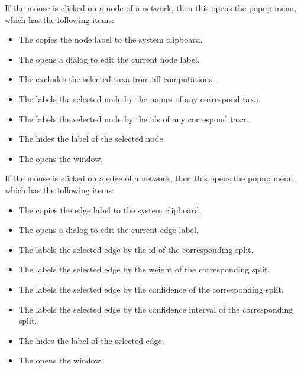 \documentclass[11pt]{article}
\begin{document}
If the mouse is clicked on a node of a network, then this opens
the  popup menu, which has the following items:
\begin{itemize}
\item The  copies the node label
to the system clipboard.
\item The  opens a dialog to edit the
current node label.
\item The  excludes the
selected taxa from all computations.
\item The  labels the selected node
by the names of any correspond taxa.
\item The  labels the selected node
by the ids of any correspond taxa.
\item The  hides the label of the selected
node.
\item The  opens the  window.
\end{itemize}

If the mouse is clicked on a edge of a network, then this opens
the  popup menu, which has the following items:
\begin{itemize}
\item The  copies the edge label
to the system clipboard.
\item The  opens a dialog to edit the
current edge label.
\item The  labels the selected edge
by the id of the corresponding split.
\item The  labels the selected edge
by the weight of the corresponding split.
\item The  labels the selected edge
by the confidence of the corresponding split.
\item The  labels the selected edge
by the confidence interval of the corresponding split.
\item The  hides the label of the selected
edge.
\item The  opens the  window.
\end{itemize}
\end{document}
